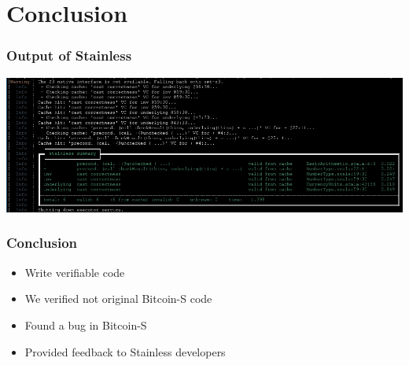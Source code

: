 \documentclass{beamer}
\begin{document}


\section{Conclusion}

\begin{frame}
\frametitle{Output of Stainless}
\centering
\includegraphics[width=\textwidth,height=0.8\textheight,keepaspectratio]{assets/final_verify_output.png}
\end{frame}

\begin{frame}
\frametitle{Conclusion}
\begin{itemize}
  \item Write verifiable code
  \item We verified not original Bitcoin-S code
  \item Found a bug in Bitcoin-S
  \item Provided feedback to Stainless developers
\end{itemize}
\end{frame}
\end{document}
